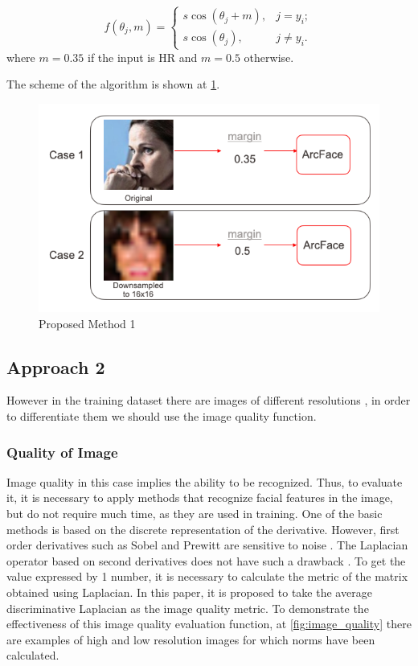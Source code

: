 \documentclass[11pt,a4paper]{article}
\begin{document}
\begin{equation*}
f(\theta_j, m) =
\begin{cases}
    s \cos(\theta_j + m), & j=y_i; \\
    s \cos(\theta_j), & j \neq y_i.
\end{cases}
\end{equation*} where $m = 0.35$ if the input is HR and $m=0.5$ otherwise. 

The scheme of the algorithm is shown at \ref{fig:app1}.

\begin{figure}[ht!]
    \centering
    \includegraphics[width=\textwidth]{app1.png}
    \caption{Proposed Method 1}
    \label{fig:app1}
\end{figure}

\subsection{Approach 2}
However in the training dataset there are images of different resolutions \cite{webface}, in order to differentiate them we should use the image quality function. 

\subsubsection{Quality of Image}

Image quality in this case implies the ability to be recognized. Thus, to evaluate it, it is necessary to apply methods that recognize facial features in the image, but do not require much time, as they are used in training. One of the basic methods is based on the discrete representation of the derivative. However, first order derivatives such as Sobel and Prewitt are sensitive to noise \cite{QualityImage2}. The Laplacian operator based on second derivatives does not have such a drawback \cite{QualityImage}. To get the value expressed by 1 number, it is necessary to calculate the metric of the matrix obtained using Laplacian. In this paper, it is proposed to take the average discriminative Laplacian as the image quality metric. To demonstrate the effectiveness of this image quality evaluation function, at \ref{fig:image_quality} there are examples of high and low resolution images for which norms have been calculated.
\end{document}
